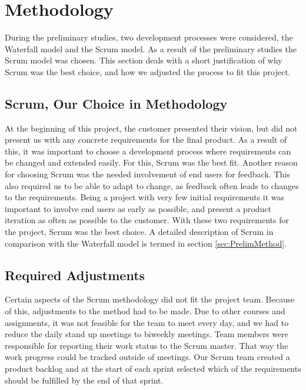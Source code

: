\section{Methodology}
\label{sec:PlanningMethod}
During the preliminary studies, two development processes were considered, the Waterfall model and the Scrum model. As a result of the preliminary studies the Scrum model was chosen. This section deals with a short justification of why Scrum was the best choice, and how we adjusted the process to fit this project.

\subsection*{Scrum, Our Choice in Methodology}
\label{subsec:PlanningMethodChoice}
At the beginning of this project, the customer presented their vision, but did not present us with any concrete requirements for the final product. As a result of this, it was important to choose a development process where requirements can be changed and extended easily. For this, Scrum was the best fit. Another reason for choosing Scrum was the needed involvement of end users for feedback. This also required us to be able to adapt to change, as feedback often leads to changes to the requirements. Being a project with very few initial requirements it was important to involve end users as early as possible, and present a  product iteration as often as possible to the customer. With these two requirements for the project, Scrum was the best choice. A detailed description of Scrum in comparison with the Waterfall model is termed in section \ref{sec:PrelimMethod}.

\subsection*{Required Adjustments}
\label{subsec:PlanningMethodAdjust}
Certain aspects of the Scrum methodology did not fit the project team. Because of this, adjustments to the method had to be made. Due to other courses and assignments, it was not feasible for the team to meet every day, and we had to reduce the daily stand up meetings to biweekly meetings. Team members were responsible for reporting their work status to the Scrum master. That way the work progress could be tracked outside of meetings. Our Scrum team created a product backlog and at the start of each sprint selected which of the requirements should be fulfilled by the end of that sprint.

